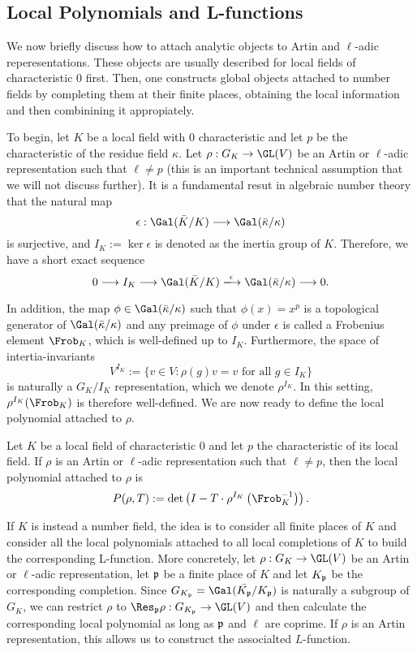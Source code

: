 \subsection{Local Polynomials and L-functions}
We now briefly discuss how to attach analytic objects to Artin and $\ell$-adic reperesentations. These objects are usually described for local fields of characteristic $0$ first. Then, one constructs global objects attached to number fields by completing them at their finite places, obtaining the local information and then combinining it appropiately. 

To begin, let $K$ be a local field with $0$ characteristic and let $p$ be the characteristic of the residue field $\kappa$. Let $\rho:G_K\to\GL(V)$ be an Artin or $\ell$-adic representation such that $\ell\neq p$ (this is an important technical assumption that we will not discuss further). It is a fundamental resut in algebraic number theory that the natural map 
$$\epsilon:\Gal(\bar{K}/K)\longrightarrow\Gal(\bar{\kappa}/\kappa)$$
is surjective, and $I_K:=\ker\epsilon$ is denoted as the inertia group of $K$. Therefore, we have a short exact sequence
$$0\longrightarrow I_K\longrightarrow \Gal(\bar{K}/K)\xlongrightarrow{\epsilon} \Gal(\bar{\kappa}/\kappa)\longrightarrow 0.$$

In addition, the map $\phi\in\Gal(\bar\kappa/\kappa)$ such that $\phi(x)=x^p$ is a topological generator of $\Gal(\bar\kappa/\kappa)$ and any preimage of $\phi$ under $\epsilon$ is called a Frobenius element $\Frob_K$, which is well-defined up to $I_K$. Furthermore, the space of intertia-invariants 
$$V^{I_K}:=\{v\in V:\rho(g)v=v\text{ for all }g\in I_K\}$$
is naturally a $G_K/I_K$ representation, which we denote $\rho^{I_K}$. In this setting, $\rho^{I_K}(\Frob_K)$ is therefore well-defined. We are now ready to define the local polynomial attached to $\rho$.

\begin{defn}
    Let $K$ be a local field of characteristic $0$ and let $p$ the characteristic of its local field. If $\rho$ is an Artin or $\ell$-adic representation such that $\ell\neq p$, then the local polynomial attached to $\rho$ is
    $$P(\rho,T):=\det\left(I-T\cdot\rho^{I_K}\left(\Frob_K^{-1}\right)\right).$$  
\end{defn}

If $K$ is instead a number field, the idea is to consider all finite places of $K$ and consider all the local polynomials attached to all local completions of $K$ to build the corresponding L-function. More concretely, let $\rho:G_K\to\GL(V)$ be an Artin or $\ell$-adic representation, let $\mathfrak{p}$ be a finite place of $K$ and let $K_{\mathfrak{p}}$ be the corresponding completion. Since $G_{K_\pp}=\Gal(\bar{K_\pp}/K_\pp)$ is naturally a subgroup of $G_K$, we can restrict $\rho$ to $\Res_\pp\rho:G_{K_\pp}\to\GL(V)$ and then calculate the corresponding local polynomial as long as $\mathfrak{p}$ and $\ell$ are coprime. If $\rho$ is an Artin representation, this allows us to construct the associalted $L$-function.

